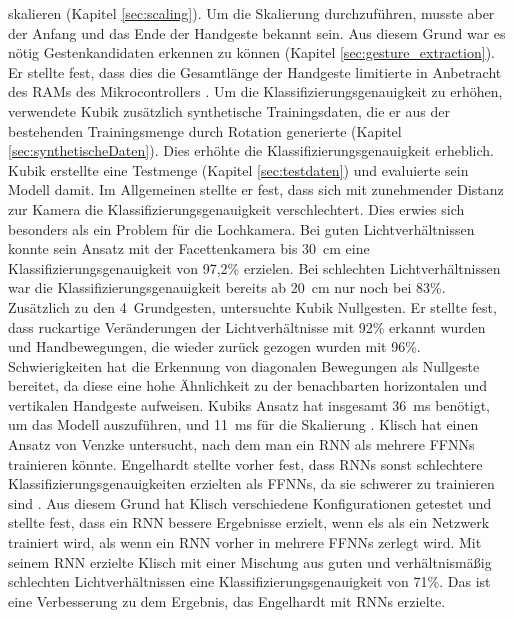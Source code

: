 skalieren (Kapitel \ref{sec:scaling}). Um die Skalierung durchzuführen, musste aber der Anfang und das Ende der Handgeste bekannt sein. Aus diesem Grund war es nötig Gestenkandidaten erkennen zu können (Kapitel
\ref{sec:gesture_extraction}). Er stellte fest, dass dies die Gesamtlänge der Handgeste limitierte in Anbetracht des RAMs des Mikrocontrollers \cite{kubikThesis}.
\newline
\newline
Um die Klassifizierungsgenauigkeit zu erhöhen, verwendete Kubik zusätzlich
synthetische Trainingsdaten, die er aus der bestehenden Trainingsmenge durch Rotation generierte (Kapitel \ref{sec:synthetischeDaten}). Dies erhöhte die Klassifizierungsgenauigkeit erheblich. Kubik erstellte eine Testmenge
(Kapitel \ref{sec:testdaten}) und evaluierte sein Modell damit. Im Allgemeinen stellte er fest, dass sich mit zunehmender Distanz zur Kamera die Klassifizierungsgenauigkeit verschlechtert. Dies erwies sich besonders als ein
Problem für die Lochkamera. Bei guten Lichtverhältnissen konnte sein Ansatz mit der Facettenkamera bis 30~cm eine Klassifizierungsgenauigkeit von 97,2\% erzielen. Bei schlechten Lichtverhältnissen war die Klassifizierungsgenauigkeit
bereits ab 20~cm nur noch bei 83\%. Zusätzlich zu den 4~Grundgesten, untersuchte Kubik Nullgesten. Er stellte fest, dass ruckartige Veränderungen der Lichtverhältnisse mit 92\% erkannt wurden und Handbewegungen, die wieder
zurück gezogen wurden mit 96\%. Schwierigkeiten hat die Erkennung von diagonalen Bewegungen als Nullgeste bereitet, da diese eine hohe Ähnlichkeit zu der benachbarten horizontalen und vertikalen Handgeste aufweisen. Kubiks Ansatz
hat insgesamt 36~ms benötigt, um das Modell auszuführen, und 11~ms für die Skalierung \cite{kubikThesis}.
\newline
\newline
Klisch hat einen Ansatz von Venzke untersucht, nach dem man ein RNN als mehrere FFNNs trainieren könnte. Engelhardt stellte vorher fest, dass RNNs sonst schlechtere
Klassifizierungsgenauigkeiten erzielten als FFNNs, da sie schwerer zu trainieren sind \cite{engelhardtThesis}. Aus diesem Grund hat Klisch verschiedene Konfigurationen getestet und stellte fest,
dass ein RNN bessere Ergebnisse erzielt, wenn els als ein Netzwerk trainiert wird, als wenn ein RNN vorher in mehrere FFNNs zerlegt wird. Mit seinem RNN erzielte Klisch mit einer Mischung aus guten und
verhältnismäßig schlechten Lichtverhältnissen eine Klassifizierungsgenauigkeit von 71\%. Das ist eine Verbesserung zu dem Ergebnis, das Engelhardt mit RNNs erzielte.
